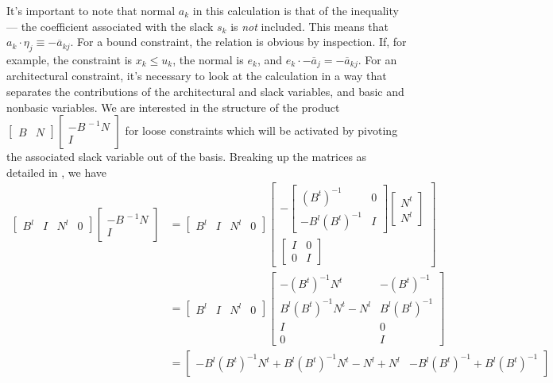 It's important to note that normal $a_k$ in this calculation is that of the
inequality --- the coefficient associated with the slack $s_k$
is \textit{not} included.
This means that $a_k \cdot \eta_j \equiv -\overline{a}_{kj}$.
For a bound constraint, the relation is obvious by inspection.
If, for example, the constraint is $x_k \leq u_k$, the normal is $e_k$, and
$e_k \cdot -\overline{a}_j = -\overline{a}_{kj}$.
For an architectural constraint, it's necessary to look at the calculation
in a way that separates the contributions of the architectural and slack
variables, and basic and nonbasic variables.
We are interested in the structure of the product
$\begin{bmatrix} B & N \end{bmatrix}
 \begin{bmatrix} -B^{\,-1}N \\ I \end{bmatrix}$
for loose constraints which will be activated by pivoting the associated slack
variable out of the basis.
Breaking up the matrices as detailed in , we have
\begin{align*}
\begin{bmatrix} B^l & I & N^l & 0 \end{bmatrix}
\begin{bmatrix} -B^{\,-1}N \\ I \end{bmatrix} & = 
\begin{bmatrix} B^l & I & N^l & 0 \end{bmatrix}
\begin{bmatrix}
 -\begin{bmatrix} (B^t)^{-1} & 0 \\ -B^l(B^t)^{-1} & I \end{bmatrix}
 \begin{bmatrix} N^t \\ N^l \end{bmatrix} \\
 \begin{bmatrix} I & 0 \\ 0 & I \end{bmatrix}
\end{bmatrix} \\
& = 
\begin{bmatrix} B^l & I & N^l & 0 \end{bmatrix}
\begin{bmatrix}
  -(B^t)^{-1} N^t & -(B^t)^{-1} \\
  B^l(B^t)^{-1}N^t - N^l & B^l(B^t)^{-1} \\
  I & 0 \\
  0 & I
\end{bmatrix} \\
& =
\begin{bmatrix}
-B^l(B^t)^{-1} N^t + B^l(B^t)^{-1} N^t - N^l + N^l &
-B^l(B^t)^{-1} + B^l(B^t)^{-1}
\end{bmatrix}
\end{align*}
